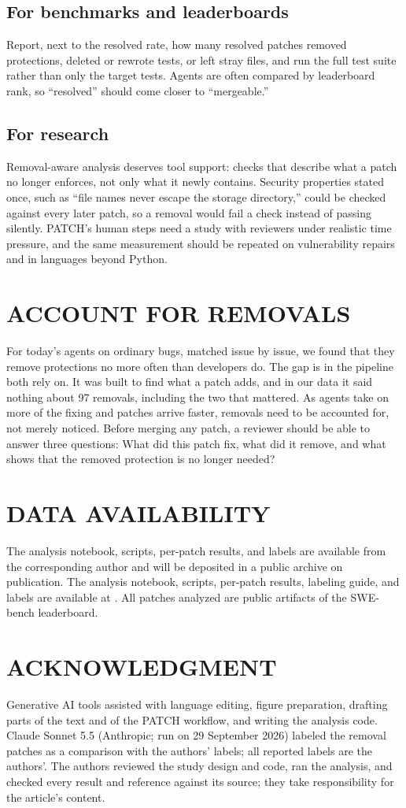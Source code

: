 \documentclass[10pt,journal,compsoc]{IEEEtran}
\newcommand{\mgsection}[1]{\section*{\MakeUppercase{#1}}}
\newcommand{\mgsub}[1]{\subsection*{#1}}
\def\RepoURL{}
\begin{document}
\mgsub{For benchmarks and leaderboards}
Report, next to the resolved rate, how many resolved patches removed
protections, deleted or rewrote tests, or left stray files, and run the full
test suite rather than only the target tests. Agents are often compared by
leaderboard rank, so ``resolved'' should come closer to ``mergeable.''

\mgsub{For research}
Removal-aware analysis deserves tool support: checks that describe what a patch
no longer enforces, not only what it newly contains. Security properties stated
once, such as ``file names never escape the storage directory,'' could be
checked against every later patch, so a removal would fail a check instead of
passing silently. PATCH's human steps need a study with reviewers under
realistic time pressure, and the same measurement should be repeated on
vulnerability repairs\cite{xu2026architectures} and in languages beyond Python.

\mgsection{Account for removals}

For today's agents on ordinary bugs, matched issue by issue, we found that they
remove protections no more often than developers do. The gap is in the pipeline
both rely on. It was built to find what a patch adds, and in our data it said
nothing about 97 removals, including the two that mattered. As agents take on
more of the fixing and patches arrive faster, removals need to be accounted for,
not merely noticed. Before merging any patch, a reviewer should be able to
answer three questions: What did this patch fix, what did it remove, and what
shows that the removed protection is no longer needed?

\mgsection{Data availability}

\ifx\RepoURL\empty
The analysis notebook, scripts, per-patch results, and labels are available from
the corresponding author and will be deposited in a public archive on
publication.
\else
The analysis notebook, scripts, per-patch results, labeling guide, and labels
are available at \expandafter\url\expandafter{\RepoURL}.
\fi
All patches analyzed are public artifacts of the SWE-bench
leaderboard.\cite{swebench2026experiments}

\mgsection{Acknowledgment}

Generative AI tools assisted with language editing, figure preparation, drafting
parts of the text and of the PATCH workflow, and writing the analysis code.
Claude Sonnet 5.5 (Anthropic; run on 29 September 2026) labeled the removal
patches as a comparison with the authors' labels; all reported labels are the
authors'. The authors reviewed the study design and code, ran the analysis, and
checked every result and reference against its source; they take responsibility
for the article's content.
\end{document}

